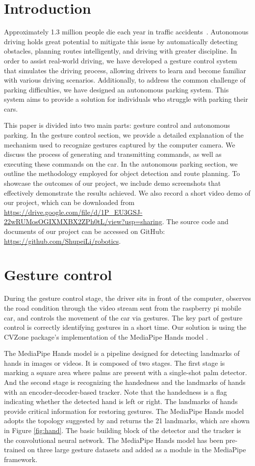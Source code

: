 \documentclass[acmsmall]{acmart}
\begin{document}
\section{Introduction}
Approximately 1.3 million people die each year in traffic accidents~\cite{who-road-traffic-injuries}. Autonomous driving holds great potential to mitigate this issue by automatically detecting obstacles, planning routes intelligently, and driving with greater discipline. In order to assist real-world driving, we have developed a gesture control system that simulates the driving process, allowing drivers to learn and become familiar with various driving scenarios. Additionally, to address the common challenge of parking difficulties, we have designed an autonomous parking system. This system aims to provide a solution for individuals who struggle with parking their cars.

This paper is divided into two main parts: gesture control and autonomous parking. In the gesture control section, we provide a detailed explanation of the mechanism used to recognize gestures captured by the computer camera. We discuss the process of generating and transmitting commands, as well as executing these commands on the car. In the autonomous parking section, we outline the methodology employed for object detection and route planning. To showcase the outcomes of our project, we include demo screenshots that effectively demonstrate the results achieved. We also record a short video demo of our project, which can be downloaded from \url{https://drive.google.com/file/d/1P_EU3GSJ-22wRUMosOGIXMXBX2ZPh0tL/view?usp=sharing}. The source code and documents of our project can be accessed on GitHub: \url{https://github.com/ShupeiLi/robotics}.

\section{Gesture control}
During the gesture control stage, the driver sits in front of the computer, observes the road condition through the video stream sent from the raspberry pi mobile car, and controls the movement of the car via gestures. The key part of gesture control is correctly identifying gestures in a short time. Our solution is using the CVZone package's implementation of the MediaPipe Hands model \cite{cvzone}.

The MediaPipe Hands model is a pipeline designed for detecting landmarks of hands in images or videos. It is composed of two stages. The first stage is marking a square area where palms are present with a single-shot palm detector. And the second stage is recognizing the handedness and the landmarks of hands with an encoder-decoder-based tracker. Note that the handedness is a flag indicating whether the detected hand is left or right. The landmarks of hands provide critical information for restoring gestures. The MediaPipe Hands model adopts the topology suggested by \cite{hand} and returns the 21 landmarks, which are shown in Figure \ref{fig:hand}. The basic building block of the detector and the tracker is the convolutional neural network. The MediaPipe Hands model has been pre-trained on three large gesture datasets and added as a module in the MediaPipe framework.
\end{document}
